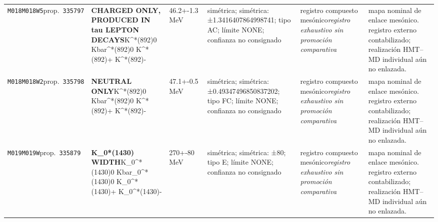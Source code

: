 \begin{landscape}
\begin{longtable}{L{1.85cm}L{4.45cm}L{2.35cm}L{4.05cm}L{3.35cm}L{7.15cm}}
\texttt{M018}\newline \texttt{M018W5}\newline prop.\ \texttt{335797} & \textbf{CHARGED ONLY, PRODUCED IN tau LEPTON DECAYS}\newline K\textasciicircum{}*(892)0 \textbar{}\allowbreak{} Kbar\textasciicircum{}*(892)0 \textbar{}\allowbreak{} K\textasciicircum{}*(892)+ \textbar{}\allowbreak{} K\textasciicircum{}*(892)- & 46.2+-1.3\,MeV & simétrica; simétrica: ±1.3416407864998741; tipo AC; límite NONE; confianza no consignado & registro compuesto mesónico\newline \emph{registro exhaustivo sin promoción comparativa} & mapa nominal de enlace mesónico. registro externo contabilizado; realización HMT--MD individual aún no enlazada. \\
\texttt{M018}\newline \texttt{M018W2}\newline prop.\ \texttt{335798} & \textbf{NEUTRAL ONLY}\newline K\textasciicircum{}*(892)0 \textbar{}\allowbreak{} Kbar\textasciicircum{}*(892)0 \textbar{}\allowbreak{} K\textasciicircum{}*(892)+ \textbar{}\allowbreak{} K\textasciicircum{}*(892)- & 47.1+-0.5\,MeV & simétrica; simétrica: ±0.49347496850837202; tipo FC; límite NONE; confianza no consignado & registro compuesto mesónico\newline \emph{registro exhaustivo sin promoción comparativa} & mapa nominal de enlace mesónico. registro externo contabilizado; realización HMT--MD individual aún no enlazada. \\
\texttt{M019}\newline \texttt{M019W}\newline prop.\ \texttt{335879} & \textbf{K\_\allowbreak{}0*(1430) WIDTH}\newline K\_\allowbreak{}0\textasciicircum{}*(1430)0 \textbar{}\allowbreak{} Kbar\_\allowbreak{}0\textasciicircum{}*(1430)0 \textbar{}\allowbreak{} K\_\allowbreak{}0\textasciicircum{}*(1430)+ \textbar{}\allowbreak{} K\_\allowbreak{}0\textasciicircum{}*(1430)- & 270+-80\,MeV & simétrica; simétrica: ±80; tipo E; límite NONE; confianza no consignado & registro compuesto mesónico\newline \emph{registro exhaustivo sin promoción comparativa} & mapa nominal de enlace mesónico. registro externo contabilizado; realización HMT--MD individual aún no enlazada. \\

\end{longtable}
\end{landscape}
